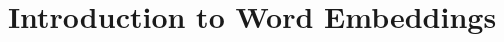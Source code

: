 \documentclass[xcolor=dvipsnames,compress,t,pdf,9pt]{beamer}
\title[\insertframenumber /\inserttotalframenumber]{Introduction to Word Embeddings}
\begin{document}
	\begin{frame}
	\titlepage
	\end{frame}

	
	
\end{document}
